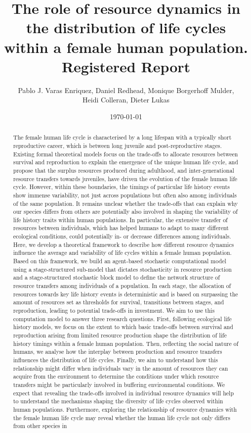 \documentclass{article}
\title{The role of resource dynamics in the distribution of life cycles within a female human population.
\\
Registered Report}
\author{Pablo J. Varas Enriquez, Daniel Redhead, Monique Borgerhoff Mulder,
\\
Heidi Colleran, Dieter Lukas}
\date{\today}
\begin{document}
\maketitle

\tableofcontents

\begin{abstract}
    The female human life cycle is characterised by a long lifespan with a typically short reproductive career, which is between long juvenile and post-reproductive stages. Existing formal theoretical models focus on the trade-offs to allocate resources between survival and reproduction to explain the emergence of the unique human life cycle, and propose that the surplus resources produced during adulthood, and inter-generational resource transfers towards juveniles, have driven the evolution of the female human life cycle. However, within these boundaries, the timings of particular life history events show immense variability, not just across populations but often also among individuals of the same population. It remains unclear whether the trade-offs that can explain why our species differs from others are potentially also involved in shaping the variability of life history traits within human populations. In particular, the extensive transfer of resources between individuals, which has helped humans to adapt to many different ecological conditions, could potentially in- or decrease differences among individuals. Here, we develop a theoretical framework to describe how different resource dynamics influence the average and variability of life cycles within a female human population. Based on this framework, we build an agent-based stochastic computational model using a stage-structured sub-model that dictates stochasticity in resource production and a stage-structured stochastic block model to define the network structure of resource transfers among individuals of a population. In each stage, the allocation of resources towards key life history events is deterministic and is based on surpassing the amount of resources set as thresholds for survival, transitions between stages, and reproduction, leading to potential trade-offs in investment. We aim to use this computation model to answer three research questions. First, following ecological life history models, we focus on the extent to which basic trade-offs between survival and reproduction arising from limited resource production shape the distribution of life history timings within a female human population. Then, reflecting the social nature of humans, we analyse how the interplay between production and resource transfers influences the distribution of life cycles. Finally, we aim to understand how this relationship might differ when individuals vary in the amount of resources they can acquire from the environment to determine the conditions under which resource transfers might be particularly involved in buffering environmental conditions. We expect that revealing the trade-offs involved in individual resource dynamics will help to understand the mechanisms shaping the diversity of life cycles observed within human populations. Furthermore, exploring the relationship of resource dynamics with the female human life cycle may reveal whether the human life cycle not only differs from other species in 
\end{abstract}
\end{document}
